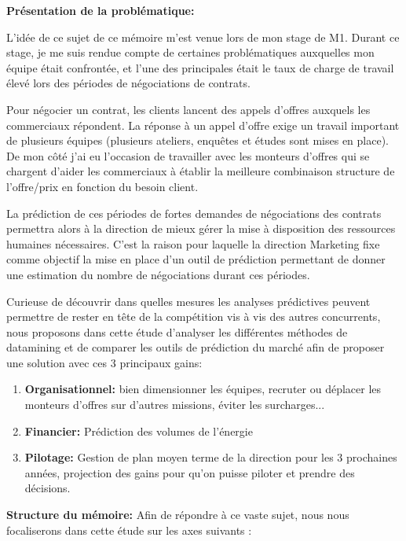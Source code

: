 \documentclass[12pt]{article}
\begin{document}
\textbf{\large Présentation de la problématique:}

L'idée de  ce sujet de ce mémoire m'est venue lors de mon stage de M1. Durant ce stage, je me suis rendue compte de certaines problématiques auxquelles mon équipe était confrontée, et l'une des principales était le taux de charge de travail élevé lors des périodes de négociations de contrats.

Pour négocier un contrat, les clients lancent des appels d’offres auxquels les commerciaux répondent.
La réponse à un appel d’offre exige un travail important de plusieurs équipes (plusieurs ateliers, enquêtes et études sont mises en place). De mon côté j’ai eu l’occasion de travailler avec les monteurs d’offres qui se chargent d’aider les commerciaux à établir la meilleure combinaison structure de l’offre/prix en fonction du besoin client.

La prédiction de ces périodes de fortes demandes de négociations des contrats permettra alors à la direction de mieux gérer la mise à disposition des ressources humaines nécessaires.
C’est la raison pour laquelle la direction Marketing fixe comme objectif la mise en place d’un outil de prédiction permettant de donner une estimation du nombre de négociations durant ces périodes.

Curieuse de découvrir dans quelles mesures les analyses prédictives peuvent permettre de rester en tête de la compétition vis à vis des autres concurrents, nous proposons dans cette étude d’analyser les différentes méthodes de datamining et de comparer les outils de prédiction du marché afin de proposer une solution avec ces 3 principaux gains:

\begin{enumerate}
\item \textbf{Organisationnel:} bien dimensionner les équipes, recruter ou déplacer les monteurs d'offres sur d'autres missions, éviter les surcharges...

\item \textbf{Financier:} Prédiction des volumes de l'énergie

\item \textbf{Pilotage:} Gestion de plan moyen terme de la direction pour les 3 prochaines années, projection des gains pour qu'on puisse piloter et prendre des décisions.
\end{enumerate}
 \medbreak
\textbf{\large Structure du mémoire:}
 \medbreak
Afin de répondre à ce vaste sujet, nous nous focaliserons dans cette étude sur les axes suivants :
\end{document}
